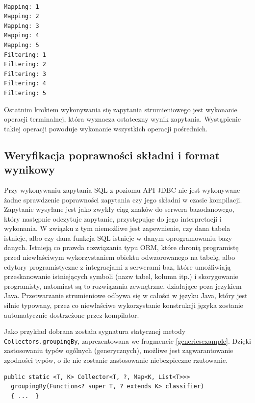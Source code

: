 \documentclass[12pt]{extarticle}
\begin{document}
\begin{verbatim}

Mapping: 1
Mapping: 2
Mapping: 3
Mapping: 4
Mapping: 5
Filtering: 1
Filtering: 2
Filtering: 3
Filtering: 4
Filtering: 5

\end{verbatim}

    Ostatnim krokiem wykonywania się zapytania strumieniowego jest wykonanie operacji terminalnej, która wyznacza ostateczny wynik zapytania. Wystąpienie takiej operacji powoduje wykonanie wszystkich operacji pośrednich. 

\subsection{Weryfikacja poprawności składni i format wynikowy}

    Przy wykonywaniu zapytania SQL z poziomu API JDBC nie jest wykonywane żadne sprawdzenie poprawności zapytania czy jego składni w czasie kompilacji. Zapytanie wysyłane jest jako zwykły ciąg znaków do serwera bazodanowego, który następnie odczytuje zapytanie, przystępując do jego interpretacji i wykonania. W związku z tym niemożliwe jest zapewnienie, czy dana tabela istnieje, albo czy dana funkcja SQL istnieje w danym oprogramowaniu bazy danych. Istnieją co prawda rozwiązania typu ORM, które chronią programistę przed niewłaściwym wykorzystaniem obiektu odwzorowanego na tabelę, albo edytory programistyczne z integracjami z serwerami baz, które umożliwiają przeskanowanie istniejących symboli (nazw tabel, kolumn itp.) i skorygowanie programisty, natomiast są to rozwiązania zewnętrzne, działające poza językiem Java. Przetwarzanie strumieniowe odbywa się w całości w języku Java, który jest silnie typowany, przez co niewłaściwe wykorzystanie konstrukcji języka zostanie automatycznie dostrzeżone przez kompilator.
    
    Jako przykład dobrana została sygnatura statycznej metody \newline \texttt{Collectors.groupingBy}, zaprezentowana we fragmencie \ref{genericsexample}. Dzięki zastosowaniu typów ogólnych \cite{generics} (generycznych), możliwe jest zagwarantowanie zgodności typów, o ile nie zostanie zastosowanie niebezpieczne rzutowanie.

\begin{lstlisting}[label=genericsexample, caption=Sygnatura metody grupującej]
  public static <T, K> Collector<T, ?, Map<K, List<T>>>
  groupingBy(Function<? super T, ? extends K> classifier) 
  { ...  }
\end{lstlisting}
\end{document}

